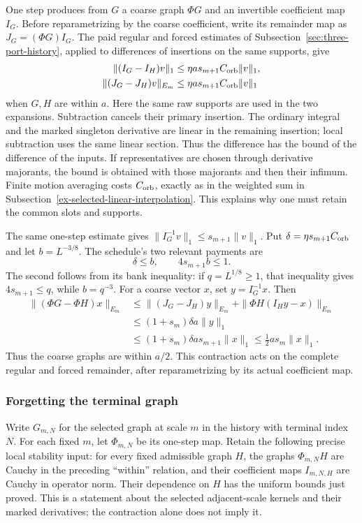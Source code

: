 One step produces from $G$ a coarse graph $\Phi G$ and an
invertible coefficient map $I_G$. Before reparametrizing by the
coarse coefficient, write its remainder map as
$J_G=(\Phi G)I_G$. The paid regular and forced estimates of
Subsection~\ref{sec:three-port-history}, applied to differences of
insertions on the same supports, give
\begin{equation}\label{eq:fixed-rung-difference}
 \begin{split}
 \|(I_G-I_H)v\|_1&\le \eta a s_{m+1}C_{\rm orb}\|v\|_1,\\
 \|(J_G-J_H)v\|_{E_m}&\le \eta a s_{m+1}C_{\rm orb}\|v\|_1
 \end{split}
\end{equation}
when $G,H$ are within $a$. Here the same raw supports are used in
the two expansions. Subtraction cancels their primary insertion.
The ordinary integral and the marked singleton derivative are linear
in the remaining insertion; local subtraction uses the same linear
section. Thus the difference has the bound of the difference of the
inputs. If representatives are chosen through derivative majorants,
the bound is obtained with those majorants and then their infimum.
Finite motion averaging costs $C_{\rm orb}$, exactly as in the
weighted sum in Subsection~\ref{ex-selected-linear-interpolation}.
This explains why one must retain the common slots and supports.

The same one-step estimate gives
$\|I_G^{-1}v\|_1\le s_{m+1}\|v\|_1$.
Put $\delta=\eta s_{m+1}C_{\rm orb}$ and let $b=L^{-3/8}$.
The schedule's two relevant payments are
\[
              \delta\le b,\qquad 4s_{m+1}b\le1.
\]
The second follows from its bank inequality: if $q=L^{1/8}\ge1$,
that inequality gives $4s_{m+1}\le q$, while $b=q^{-3}$.
For a coarse vector $x$, set $y=I_G^{-1}x$. Then
\begin{align*}
 \|(\Phi G-\Phi H)x\|_{E_m}
 &\le\|(J_G-J_H)y\|_{E_m}
       +\|\Phi H(I_Hy-x)\|_{E_m}\\
 &\le(1+s_m)\delta a\|y\|_1\\
 &\le(1+s_m)\delta a s_{m+1}\|x\|_1
 \le \tfrac12 a s_m\|x\|_1.
\end{align*}
Thus the coarse graphs are within $a/2$. This contraction acts on
the complete regular and forced remainder, after reparametrizing
by its actual coefficient map.

\subsubsection{Forgetting the terminal graph}
Write $G_{m,N}$ for the selected graph at scale $m$ in the history
with terminal index $N$. For each fixed $m$, let $\Phi_{m,N}$
be its one-step map. Retain the following precise local stability
input: for every fixed admissible graph $H$, the graphs
$\Phi_{m,N}H$ are Cauchy in the preceding ``within'' relation,
and their coefficient maps $I_{m,N,H}$ are Cauchy in operator
norm. Their dependence on $H$ has the uniform bounds just proved.
This is a statement about the selected adjacent-scale kernels and
their marked derivatives; the contraction alone does not imply it.

